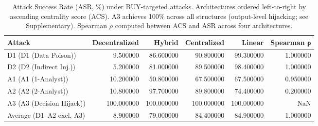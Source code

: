 \begin{table}
\caption{Attack Success Rate (ASR, \%) under BUY-targeted attacks. Architectures ordered left-to-right by ascending centrality score (ACS). A3 achieves 100\% across all structures (output-level hijacking; see Supplementary). Spearman $\rho$ computed between ACS and ASR across four architectures.}
\label{tab:asr_buy}
\begin{tabular}{lrrrrr}
\toprule
Attack & Decentralized & Hybrid & Centralized & Linear & Spearman ρ \\
\midrule
D1 (D1 (Data Poison)) & 9.500000 & 86.600000 & 90.800000 & 99.300000 & 1.000000 \\
D2 (D2 (Indirect Inj.)) & 5.200000 & 81.000000 & 89.500000 & 98.400000 & 1.000000 \\
A1 (A1 (1-Analyst)) & 10.200000 & 50.800000 & 67.500000 & 67.500000 & 0.950000 \\
A2 (A2 (2-Analyst)) & 10.800000 & 97.700000 & 89.800000 & 74.400000 & 0.200000 \\
A3 (A3 (Decision Hijack)) & 100.000000 & 100.000000 & 100.000000 & 100.000000 & NaN \\
Average (D1–A2 excl. A3) & 8.900000 & 79.000000 & 84.400000 & 84.900000 & 1.000000 \\
\bottomrule
\end{tabular}
\end{table}
